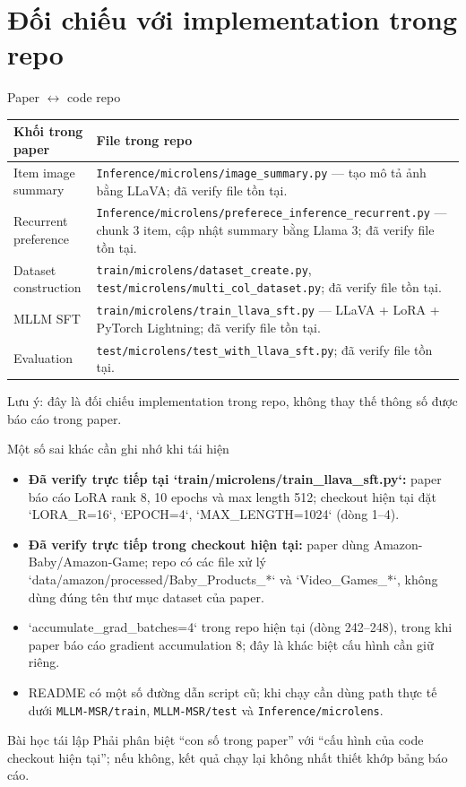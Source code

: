 \section{Đối chiếu với implementation trong repo}
\begin{frame}{Paper \texorpdfstring{$\leftrightarrow$}{<->} code repo}
  \begin{table}\centering\tiny
    \begin{tabular}{p{2.9cm}p{6.9cm}}\toprule
      \textbf{Khối trong paper} & \textbf{File trong repo}\\\midrule
      Item image summary & \texttt{Inference/microlens/}\texttt{image\_summary.py} — tạo mô tả ảnh bằng LLaVA; đã verify file tồn tại.\\
      Recurrent preference & \texttt{Inference/microlens/}\texttt{preferece\_inference\_recurrent.py} — chunk 3 item, cập nhật summary bằng Llama 3; đã verify file tồn tại.\\
      Dataset construction & \texttt{train/microlens/}\texttt{dataset\_create.py}, \texttt{test/microlens/}\texttt{multi\_col\_dataset.py}; đã verify file tồn tại.\\
      MLLM SFT & \texttt{train/microlens/}\texttt{train\_llava\_sft.py} — LLaVA + LoRA + PyTorch Lightning; đã verify file tồn tại.\\
      Evaluation & \texttt{test/microlens/}\texttt{test\_with\_llava\_sft.py}; đã verify file tồn tại.\\\bottomrule
    \end{tabular}
  \end{table}
  \vspace{0.15cm}\scriptsize\textcolor{Logo1}{Lưu ý:} đây là đối chiếu implementation trong repo, không thay thế thông số được báo cáo trong paper.
\end{frame}

\begin{frame}{Một số sai khác cần ghi nhớ khi tái hiện}
  \begin{itemize}
    \item \textbf{Đã verify trực tiếp tại `train/microlens/train\_llava\_sft.py`:} paper báo cáo LoRA rank 8, 10 epochs và max length 512; checkout hiện tại đặt `LORA\_R=16`, `EPOCH=4`, `MAX\_LENGTH=1024` (dòng 1--4).
    \item \textbf{Đã verify trực tiếp trong checkout hiện tại:} paper dùng Amazon-Baby/Amazon-Game; repo có các file xử lý `data/amazon/processed/Baby\_Products\_*` và `Video\_Games\_*`, không dùng đúng tên thư mục dataset của paper.
    \item `accumulate\_grad\_batches=4` trong repo hiện tại (dòng 242--248), trong khi paper báo cáo gradient accumulation 8; đây là khác biệt cấu hình cần giữ riêng.
    \item README có một số đường dẫn script cũ; khi chạy cần dùng path thực tế dưới \texttt{MLLM-MSR/train}, \texttt{MLLM-MSR/test} và \texttt{Inference/microlens}.
  \end{itemize}
  \begin{block}{Bài học tái lập}
    Phải phân biệt “con số trong paper” với “cấu hình của code checkout hiện tại”; nếu không, kết quả chạy lại không nhất thiết khớp bảng báo cáo.
  \end{block}
\end{frame}
